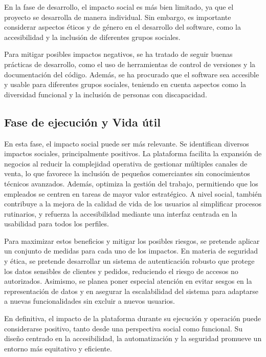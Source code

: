 En la fase de desarrollo, el impacto social es más bien limitado, ya que el proyecto se desarrolla de manera individual. Sin embargo, es importante considerar aspectos éticos y de género en el desarrollo del software, como la accesibilidad y la inclusión de diferentes grupos sociales.

Para mitigar posibles impactos negativos, se ha tratado de seguir buenas prácticas de desarrollo, como el uso de herramientas de control de versiones y la documentación del código. Además, se ha procurado que el software sea accesible y usable para diferentes grupos sociales, teniendo en cuenta aspectos como la diversidad funcional y la inclusión de personas con discapacidad.

\subsection{Fase de ejecución y Vida útil}

En esta fase, el impacto social puede ser más relevante. Se identifican diversos impactos sociales, principalmente positivos. La plataforma facilita la expansión de negocios al reducir la complejidad operativa de gestionar múltiples canales de venta, lo que favorece la inclusión de pequeños comerciantes sin conocimientos técnicos avanzados. Además, optimiza la gestión del trabajo, permitiendo que los empleados se centren en tareas de mayor valor estratégico. A nivel social, también contribuye a la mejora de la calidad de vida de los usuarios al simplificar procesos rutinarios, y refuerza la accesibilidad mediante una interfaz centrada en la usabilidad para todos los perfiles.

Para maximizar estos beneficios y mitigar los posibles riesgos, se pretende aplicar un conjunto de medidas para cada uno de los impactos. En materia de seguridad y ética, se pretende desarrollar un sistema de autenticación robusto que protege los datos sensibles de clientes y pedidos, reduciendo el riesgo de accesos no autorizados. Asimismo, se planea poner especial atención en evitar sesgos en la representación de datos y en asegurar la escalabilidad del sistema para adaptarse a nuevas funcionalidades sin excluir a nuevos usuarios.

En definitiva, el impacto de la plataforma durante su ejecución y operación puede considerarse positivo, tanto desde una perspectiva social como funcional. Su diseño centrado en la accesibilidad, la automatización y la seguridad promueve un entorno más equitativo y eficiente.

